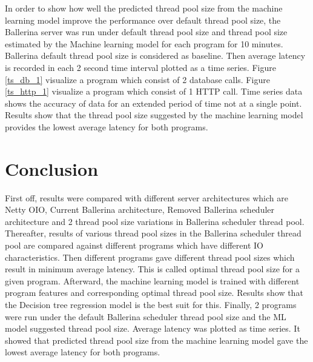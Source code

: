 In order to show how well the predicted thread pool size from the machine learning model improve the performance over default thread pool size, the Ballerina server was run under default thread pool size and thread pool size estimated by the Machine learning model for each program for 10 minutes. Ballerina default thread pool size is considered as baseline. Then average latency is recorded in each 2 second time interval plotted as a time series. Figure \ref{ts_db_1} visualize a program which consist of 2 database calls. Figure \ref{ts_http_1} visualize a program which consist of 1 HTTP call. Time series data shows the accuracy of data for an extended period of time not at a single point. Results show that the thread pool size suggested by the machine learning model provides the lowest average latency for both programs.

\section{Conclusion}

First off, results were compared with different server architectures which are Netty OIO, Current Ballerina architecture, Removed Ballerina scheduler architecture and 2 thread pool size variations in Ballerina scheduler thread pool. Thereafter, results of various thread pool sizes in the Ballerina scheduler thread pool are compared against different programs which have different IO characteristics. Then different programs gave different thread pool sizes which result in minimum average latency. This is called optimal thread pool size for a given program. Afterward, the machine learning model is trained with different program features and corresponding optimal thread pool size. Results show that the Decision tree regression model is the best suit for this. Finally,  2 programs were run under the default Ballerina scheduler thread pool size and the ML model suggested thread pool size. Average latency was plotted as time series. It showed that predicted thread pool size from the machine learning model gave the lowest average latency for both programs. 

